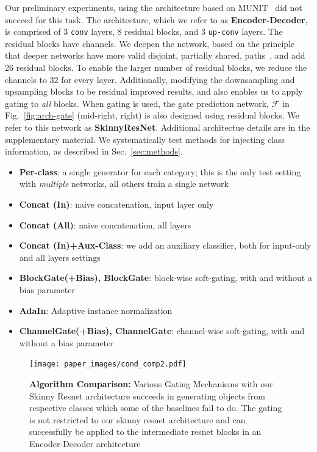  Our preliminary experiments, using the architecture based on MUNIT~\cite{huang2018multimodal} did not succeed for this task. The architecture, which we refer to as {\bf Encoder-Decoder}, is comprised of 3 \texttt{conv} layers, 8 residual blocks, and 3 \texttt{up-conv} layers. The residual blocks have  channels. We deepen the network, based on the principle that deeper networks have more valid disjoint, partially shared, paths~\cite{veit2016residual}, and add 26 residual blocks. To enable the larger number of residual blocks, we reduce the channels to 32 for every layer. Additionally, modifying the downsampling and upsampling blocks to be residual improved results, and also enables us to apply gating to {\em all} blocks. %
When gating is used, the gate prediction network, $\mathcal{F}$ in Fig.~\ref{fig:arch-gate} (mid-right, right) is also designed using residual blocks. We refer to this network as \textbf{SkinnyResNet}. Additional architectue details are in the supplementary material. 
We systematically test methods for injecting class information, as described in Sec.~\ref{sec:methods}. \begin{itemize}[noitemsep]
\item{\bf Per-class}: a single generator for each category; this is the only test setting with \textit{multiple} networks, all others train a single network
\item{\bf Concat (In)}: naive concatenation, input layer only
\item{\bf Concat (All)}: naive concatenation, all layers
\item{\bf Concat (In)+Aux-Class}: we add an auxiliary classifier, both for input-only and all layers settings
\item{\bf BlockGate(+Bias), BlockGate}: block-wise soft-gating, with and without a bias parameter
\item{\bf AdaIn}: Adaptive instance normalization
\item{\bf ChannelGate(+Bias), ChannelGate}: channel-wise soft-gating, with and without a bias parameter
\end{itemize}



\begin{figure}[h]
    \centering
    \texttt{[image: paper\_images/cond\_comp2.pdf]}
    \caption{{\bf Algorithm Comparison:} Various Gating Mechanisms with our Skinny Resnet architecture succeeds in generating objects from respective classes which some of the baselines fail to do. The gating is not restricted to our skinny resnet architecture and can successfully be applied to the intermediate resnet blocks in an Encoder-Decoder architecture \cite{huang2018multimodal} \label{fig:alg_comp} }
    \vspace{-4mm}
\end{figure}


